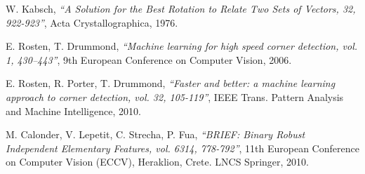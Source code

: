\documentclass[a4paper, 12pt]{report}
\numberwithin{equation}{section}
\begin{document}

















\listoffigures

\begin{thebibliography}{9}
        W. Kabsch,
            \emph{``A Solution for the Best Rotation to Relate Two Sets of Vectors, 32, 922-923''},
          Acta Crystallographica, 1976.
        
        E. Rosten, T. Drummond,
        \emph{``Machine learning for high speed corner detection, vol. 1, 430–443''},
        9th European Conference on Computer Vision, 2006.
       
       	E. Rosten, R. Porter, T. Drummond,
       	\emph{``Faster and better: a machine learning approach to corner detection, vol. 32, 105-119''},
       	IEEE Trans. Pattern Analysis and Machine Intelligence, 2010.
       	
       	M. Calonder, V. Lepetit, C. Strecha, P. Fua,
       	\emph{``BRIEF: Binary Robust Independent Elementary Features, vol. 6314, 778-792''},
       	11th European Conference on Computer Vision (ECCV), Heraklion, Crete. LNCS Springer, 2010.
       	
      
       	
\end{thebibliography}
\end{document}

